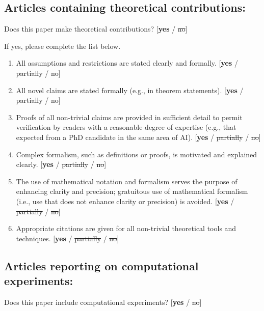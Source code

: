 \documentclass[]{jair}
\renewcommand{\bf}[1]{\textbf{#1}}  %
\begin{document}
\subsection*{Articles containing theoretical contributions:}
Does this paper make theoretical contributions? %
[\bf{yes} / \st{no}]

If yes, please complete the list below.

\begin{enumerate}
    \item All assumptions and restrictions are stated clearly and formally. \newline
    [\bf{yes} / \st{partially} / \st{no}]
    \item All novel claims are stated formally (e.g., in theorem statements). \newline
    [\bf{yes} / \st{partially} / \st{no}]
    \item Proofs of all non-trivial claims are provided in sufficient detail
    to permit verification by readers with a reasonable degree of expertise
    (e.g., that expected from a PhD candidate in the same area of AI). \newline
    [\bf{yes} / \st{partially} / \st{no}]
    \item Complex formalism, such as definitions or proofs,
    is motivated and explained clearly. \newline
    [\bf{yes} / \st{partially} / \st{no}]
    \item The use of mathematical notation and formalism serves the purpose of 
    enhancing clarity and precision; gratuitous use of mathematical formalism 
    (i.e., use that does not enhance clarity or precision) is avoided. \newline
    [\bf{yes} / \st{partially} / \st{no}]
    \item Appropriate citations are given for all non-trivial
    theoretical tools and techniques. \newline
    [\bf{yes} / \st{partially} / \st{no}]
\end{enumerate}

\subsection*{Articles reporting on computational experiments:}
Does this paper include computational experiments? %
[\bf{yes} / \st{no}]
\end{document}
